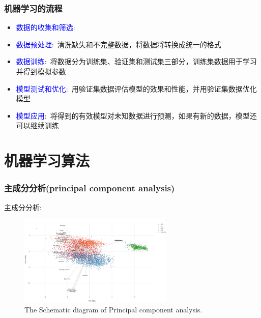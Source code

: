 \frame
{
	\frametitle{机器学习的流程}
\begin{itemize}
	\item \textcolor{blue}{数据的收集和筛选}:~{\fontsize{8.0pt}{4.2pt}\selectfont{从现有数据中产生并选择与问题解决有用和相关的数据子集}}
	\item \textcolor{blue}{数据预处理}:~清洗缺失和不完整数据，将数据将转换成统一的格式{\fontsize{8.0pt}{4.2pt}\selectfont{(如整型、字符串型等)}}%
	\item \textcolor{blue}{数据训练}:~将数据分为训练集、验证集和测试集三部分，训练集数据用于学习并得到模拟参数{\fontsize{8.0pt}{4.2pt}\selectfont{(主要针对监督学习)}}
	\item \textcolor{blue}{模型测试和优化}:~用验证集数据评估模型的效果和性能，并用验证集数据优化模型
		\vskip 3pt
		{\fontsize{8.0pt}{4.2pt}\selectfont{一旦完成优化，用测试集数据评定模型的性能}}%
	\item \textcolor{blue}{模型应用}:~将得到的有效模型对未知数据进行预测，如果有新的数据，模型还可以继续训练
\end{itemize}
}

\section{机器学习算法}
\frame
{
	\frametitle{主成分分析\textrm{(principal component analysis)}}
	主成分分析:\\
	{\fontsize{8.0pt}{4.2pt}\selectfont{\textcolor{blue}{将高维数据投影到数据点集中的区域，并使数据在新轴向周围聚集度最高}}}
{\fontsize{8.0pt}{4.2pt}}
\begin{figure}[h!]
\centering
\vspace*{-0.1in}
\includegraphics[height=1.70in,width=2.9in,viewport=0 0 1040 620,clip]{Figures/ML_PCM.png}
\caption{\tiny{\textrm{The Schematic diagram of Principal component analysis.}}}%
\label{ML_PCM}
\end{figure}
}

